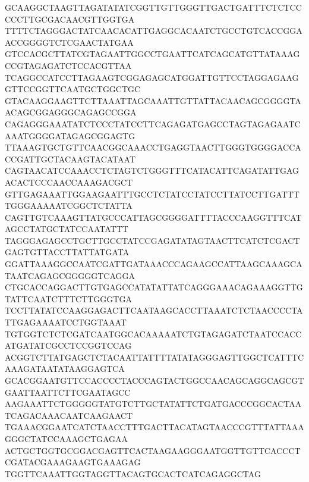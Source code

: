 GCAAGGCTAAGTTAGATATATCGGTTGTTGGGTTGACTGATTTCTCTCCCCCTTGCGACAACGTTGGTGA
TTTTCTAGGGACTATCAACACATTGAGGCACAATCTGCCTGTCACCGGAACCGGGGTCTCGAACTATGAA
GTCCACGCTTATCGTAGAATTGGCCTGAATTCATCAGCATGTTATAAAGCCGTAGAGATCTCCACGTTAA
TCAGGCCATCCTTAGAAGTCGGAGAGCATGGATTGTTCCTAGGAGAAGGTTCCGGTTCAATGCTGGCTGC
GTACAAGGAAGTTCTTAAATTAGCAAATTGTTATTACAACAGCGGGGTAACAGCGGAGGGCAGAGCCGGA
CAGAGGGAAATATCTCCCTATCCTTCAGAGATGAGCCTAGTAGAGAATCAAATGGGGATAGAGCGGAGTG
TTAAAGTGCTGTTCAACGGCAAACCTGAGGTAACTTGGGTGGGGACCACCGATTGCTACAAGTACATAAT
CAGTAACATCCAAACCTCTAGTCTGGGTTTCATACATTCAGATATTGAGACACTCCCAACCAAAGACGCT
GTTGAGAAATTGGAAGAATTTGCCTCTATCCTATCCTTATCCTTGATTTTGGGAAAAATCGGCTCTATTA
CAGTTGTCAAAGTTATGCCCATTAGCGGGGATTTTACCCAAGGTTTCATAGCCTATGCTATCCAATATTT
TAGGGAGAGCCTGCTTGCCTATCCGAGATATAGTAACTTCATCTCGACTGAGTGTTACCTTATTATGATA
GGATTAAAGGCCAATCGATTGATAAACCCAGAAGCCATTAAGCAAAGCATAATCAGAGCGGGGGTCAGGA
CTGCACCAGGACTTGTGAGCCATATATTATCAGGGAAACAGAAAGGTTGTATTCAATCTTTCTTGGGTGA
TCCTTATATCCAAGGAGACTTCAATAAGCACCTTAAATCTCTAACCCCTATTGAGAAAATCCTGGTAAAT
TGTGGTCTCTCGATCAATGGCACAAAAATCTGTAGAGATCTAATCCACCATGATATCGCCTCCGGTCCAG
ACGGTCTTATGAGCTCTACAATTATTTTATATAGGGAGTTGGCTCATTTCAAAGATAATATAAGGAGTCA
GCACGGAATGTTCCACCCCTACCCAGTACTGGCCAACAGCAGGCAGCGTGAATTAATTCTTCGAATAGCC
AAGAAATTCTGGGGGTATGTCTTGCTATATTCTGATGACCCGGCACTAATCAGACAAACAATCAAGAACT
TGAAACGGAATCATCTAACCTTTGACTTACATAGTAACCCGTTTATTAAAGGGCTATCCAAAGCTGAGAA
ACTGCTGGTGCGGACGAGTTCACTAAGAAGGGAATGGTTGTTCACCCTCGATACGAAAGAAGTGAAAGAG
TGGTTCAAATTGGTAGGTTACAGTGCACTCATCAGAGGCTAG

